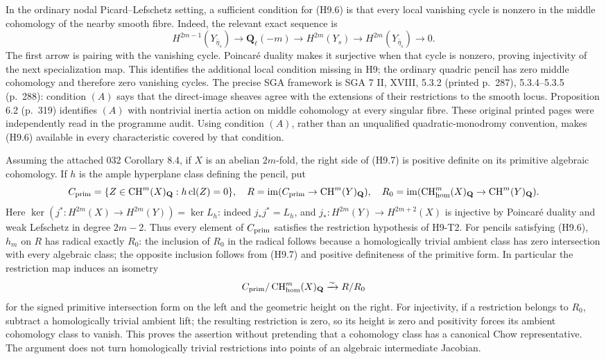 In the ordinary nodal Picard--Lefschetz setting, a sufficient condition
for (H9.6) is that every local vanishing cycle is nonzero in the middle
cohomology of the nearby smooth fibre. Indeed, the relevant exact sequence
is
\[
 H^{2m-1}(Y_{\bar\eta_s})\longrightarrow\mathbf Q_\ell(-m)
 \longrightarrow H^{2m}(Y_s)
 \longrightarrow H^{2m}(Y_{\bar\eta_s})\longrightarrow0.
\]
The first arrow is pairing with the vanishing cycle. Poincar\'e duality
makes it surjective when that cycle is nonzero, proving injectivity of the
next specialization map. This identifies the additional local condition
missing in H9; the ordinary quadric pencil has zero middle cohomology and
therefore zero vanishing cycles. The precise SGA framework is SGA 7 II,
XVIII, 5.3.2 (printed p.~287), 5.3.4--5.3.5 (p.~288): condition $(A)$ says
that the direct-image sheaves agree with the extensions of their
restrictions to the smooth locus. Proposition 6.2 (p.~319) identifies
$(A)$ with nontrivial inertia action on middle cohomology at every
singular fibre. These original printed pages were independently read in
the programme audit. Using condition $(A)$, rather than an unqualified
quadratic-monodromy convention, makes (H9.6) available in every
characteristic covered by that condition.

Assuming the attached 032 Corollary 8.4, if $X$ is an abelian $2m$-fold,
the right side of (H9.7) is positive definite on its primitive algebraic
cohomology. If $h$ is the ample hyperplane class defining the pencil, put
\[
 C_{\rm prim}=\{Z\in\operatorname{CH}^m(X)_{\mathbf Q}:
                          h\operatorname{cl}(Z)=0\},\quad
 R=\operatorname{im}(C_{\rm prim}\to\operatorname{CH}^m(Y)_{\mathbf Q}),
 \quad
 R_0=\operatorname{im}(\operatorname{CH}^m_{\rm hom}(X)_{\mathbf Q}
                         \to\operatorname{CH}^m(Y)_{\mathbf Q}).
\]
Here $\ker(j^*:H^{2m}(X)\to H^{2m}(Y))=\ker L_h$: indeed
$j_*j^*=L_h$, and $j_*:H^{2m}(Y)\to H^{2m+2}(X)$ is injective by
Poincar\'e duality and weak Lefschetz in degree $2m-2$. Thus every element
of $C_{\rm prim}$ satisfies the restriction hypothesis of H9-T2.
For pencils satisfying (H9.6), $h_m$ on $R$ has radical exactly $R_0$:
the inclusion of $R_0$ in the radical follows because a homologically
trivial ambient class has zero intersection with every algebraic class;
the opposite inclusion follows from (H9.7) and positive definiteness of
the primitive form. In particular the restriction map induces an
isometry
\[
 C_{\rm prim}/\operatorname{CH}^m_{\rm hom}(X)_{\mathbf Q}
       \xrightarrow{\sim}R/R_0
\]
for the signed primitive intersection form on the left and the geometric
height on the right. For injectivity, if a restriction belongs to $R_0$,
subtract a homologically trivial ambient lift; the resulting restriction
is zero, so its height is zero and positivity forces its ambient
cohomology class to vanish. This proves the assertion without pretending
that a cohomology class has a canonical Chow representative. The argument
does not turn homologically trivial restrictions into points of an
algebraic intermediate Jacobian.

